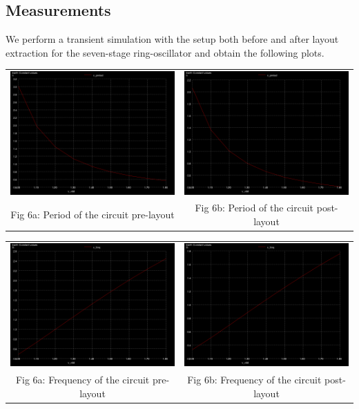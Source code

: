 \documentclass[12pt,a4paper]{article}
\begin{document}
\subsection{Measurements}
\noindent We perform a transient simulation with the setup both before and after layout extraction for the seven-stage ring-oscillator and obtain the following plots.
\begin{center}
\begin{tabular}{cc}
     \includegraphics[width=0.47\linewidth]{tut5/reports/media/ro7.pre-layout.period.png} &
     \includegraphics[width=0.47\linewidth]{tut5/reports/media/ro7.post-layout.period.png} \\
     Fig 6a: Period of the circuit pre-layout & Fig 6b: Period of the circuit post-layout
\end{tabular}
\begin{tabular}{cc}
     \includegraphics[width=0.47\linewidth]{tut5/reports/media/ro7.pre-layout.freq.png} &
     \includegraphics[width=0.47\linewidth]{tut5/reports/media/ro7.post-layout.freq.png} \\
     Fig 6a: Frequency of the circuit pre-layout & Fig 6b: Frequency of the circuit post-layout
\end{tabular}
\end{center}
\end{document}
